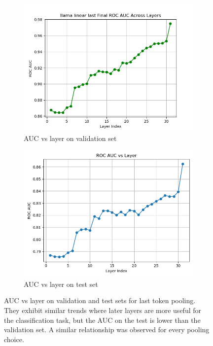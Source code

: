 \documentclass{article}
\begin{document}
\begin{figure}[h!]
    \centering
    \begin{subfigure}[b]{0.48\linewidth}
        \centering
        \includegraphics[width=\linewidth]{tex/finalreport230/last_pooling_train_auc_vs_layer.png}
        \caption{AUC vs layer on validation set}
        \label{fig:last_pooling_train_auc_vs_layer}
    \end{subfigure}
    \hfill
    \begin{subfigure}[b]{0.48\linewidth}
        \centering
        \includegraphics[width=\linewidth]{tex/finalreport230/last_pooling_test_auc_vs_layer.png}
        \caption{AUC vs layer on test set}
        \label{fig:last_pooling_test_auc_vs_layer}
    \end{subfigure}
    \caption{AUC vs layer on validation and test sets for last token pooling. They exhibit similar trends where later layers are more useful for the classification task, but the AUC on the test is lower than the validation set. A similar relationship was observed for every pooling choice.}
    \label{fig:training_test_auc_vs_layer}
\end{figure}
\end{document}
